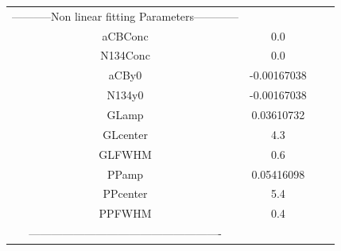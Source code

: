 \documentclass{article}
\begin{document}
\begin{tabular}{c c c c}

-----------Non linear fitting Parameters------------\\
aCBConc    &0.0\\
N134Conc   &0.0\\
aCBy0      &-0.00167038\\
N134y0     &-0.00167038\\
GLamp      &0.03610732\\
GLcenter   &4.3\\
GLFWHM     &0.6\\
PPamp      &0.05416098\\
PPcenter   &5.4\\
PPFWHM     &0.4\\
----------------------------------------------------\\


\end{tabular}
\end{document}
